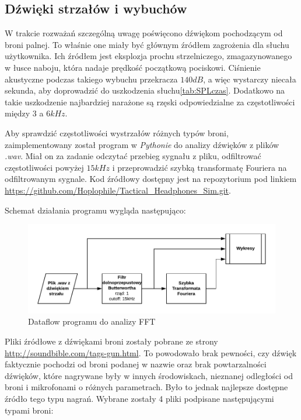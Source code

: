 \subsection{Dźwięki strzałów i wybuchów}

W trakcie rozważań szczególną uwagę poświęcono dźwiękom pochodzącym od broni palnej. To właśnie one miały być głównym źródłem zagrożenia dla słuchu użytkownika. 
Ich źródłem jest eksplozja prochu strzelniczego, zmagazynowanego w łusce naboju, która nadaje prędkość początkową pociskowi. Ciśnienie akustyczne podczas takiego wybuchu przekracza $ 140 dB $, a więc wystarczy niecała sekunda, aby doprowadzić do uszkodzenia słuchu\ref{tab:SPLczas}. Dodatkowo na takie uszkodzenie najbardziej narażone są rzęski odpowiedzialne za częstotliwości między $ 3 $ a $ 6kHz $\cite{BadaniePolicjantow}. 

Aby sprawdzić częstotliwości wystrzałów różnych typów broni, zaimplementowany został program w \textit{Pythonie} do analizy dźwięków z plików \textit{.wav}. Miał on za zadanie odczytać przebieg sygnału z pliku, odfiltrować częstotliwości powyżej $ 15kHz $ i przeprowadzić szybką transformatę Fouriera na odfiltrowanym sygnale. Kod źródłowy dostępny jest na repozytorium pod linkiem \url{https://github.com/Hoplophile/Tactical_Headphones_Sim.git}. 

Schemat działania programu wygląda następująco:

\begin{figure}[H]
	\centering
	\includegraphics[scale=0.9]{grafy/Python_analiza_FFT.pdf}
	\caption{\label{graf:analizaFFT} Dataflow programu do analizy FFT}
\end{figure}

Pliki źródłowe z dźwiękami broni zostały pobrane ze strony \url{http://soundbible.com/tags-gun.html}. To powodowało brak pewności, czy dźwięk faktycznie pochodzi od broni podanej w nazwie oraz brak powtarzalności dźwięków, które nagrywane były w innych środowiskach, nieznanej odległości od broni i mikrofonami o różnych parametrach. Było to jednak najlepsze dostępne źródło tego typu nagrań. Wybrane zostały 4 pliki podpisane następującymi typami broni:

